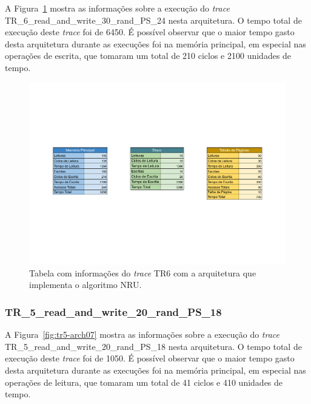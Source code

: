 \documentclass[
	12pt,				%
	oneside,   	        %
	a4paper,			%
	english,			%
	french,				%
	spanish,			%
	brazil,				%
	]{pacotes/abntex2}
\begin{document}
A Figura~\ref{fig:tr6-arch07} mostra as informações sobre a execução do \textit{trace} TR\_6\_read\_and\_write\_30\_rand\_PS\_24 nesta arquitetura. O tempo total de execução deste \textit{trace} foi de 6450.
É possível observar que o maior tempo gasto desta arquitetura durante as execuções foi na memória principal, em especial nas operações de escrita, que tomaram um total de 210 ciclos e 2100 unidades de tempo.

\begin{figure}[H]
  \centering
  \includegraphics[scale=0.5]{figuras/Architecture07-TLB(none) TR6.pdf}
  \caption{Tabela com informações do \textit{trace} TR6 com a arquitetura que implementa o algoritmo NRU.}
  \label{fig:tr6-arch07}
\end{figure}

\subsubsection{TR\_5\_read\_and\_write\_20\_rand\_PS\_18}
\label{subsubsec:tr5-arch7}

A Figura~\ref{fig:tr5-arch07} mostra as informações sobre a execução do \textit{trace} TR\_5\_read\_and\_write\_20\_rand\_PS\_18 nesta arquitetura. O tempo total de execução deste \textit{trace} foi de 1050.
É possível observar que o maior tempo gasto desta arquitetura durante as execuções foi na memória principal, em especial nas operações de leitura, que tomaram um total de 41 ciclos e 410 unidades de tempo.
\end{document}
